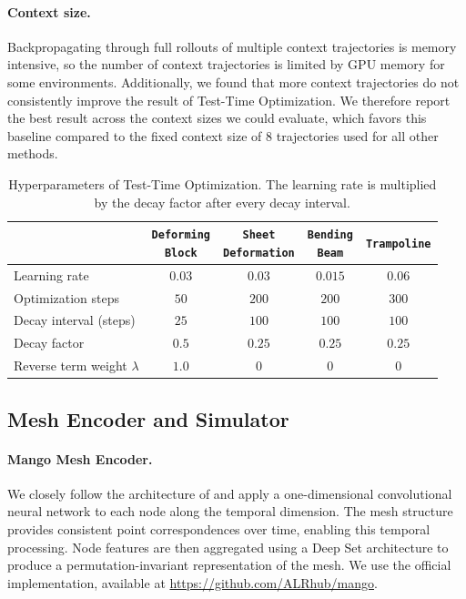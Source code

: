 \paragraph{Context size.}
Backpropagating through full rollouts of multiple context trajectories is memory intensive, so the number of context trajectories is limited by GPU memory for some environments. Additionally, we found that more context trajectories do not consistently improve the result of Test-Time Optimization. We therefore report the best result across the context sizes we could evaluate, which favors this baseline compared to the fixed context size of $8$ trajectories used for all other methods.

\begin{table}[t]
    \centering
    \caption{Hyperparameters of Test-Time Optimization. The learning rate is multiplied by the decay factor after every decay interval.}
    \label{tab:tto_hparams}
    \begin{tabular}{lcccc}
    \toprule
     & \shortstack{\texttt{Deforming}\\\texttt{Block}} & \shortstack{\texttt{Sheet}\\\texttt{Deformation}} & \shortstack{\texttt{Bending}\\\texttt{Beam}} & \texttt{Trampoline} \\
    \midrule
    Learning rate & $0.03$ & $0.03$ & $0.015$ & $0.06$ \\
    Optimization steps & $50$ & $200$ & $200$ & $300$ \\
    Decay interval (steps) & $25$ & $100$ & $100$ & $100$ \\
    Decay factor & $0.5$ & $0.25$ & $0.25$ & $0.25$ \\
    Reverse term weight $\lambda$ & $1.0$ & $0$ & $0$ & $0$ \\
    \bottomrule
    \end{tabular}
\end{table}

\subsection{Mesh Encoder and Simulator}
\paragraph{Mango Mesh Encoder.}
We closely follow the architecture of \citep{dahlinger2025mango} and apply a one-dimensional convolutional neural network to each node along the temporal dimension. The mesh structure provides consistent point correspondences over time, enabling this temporal processing. Node features are then aggregated using a Deep Set architecture \citep{cai2023deepset} to produce a permutation-invariant representation of the mesh. We use the official implementation, available at \url{https://github.com/ALRhub/mango}.



